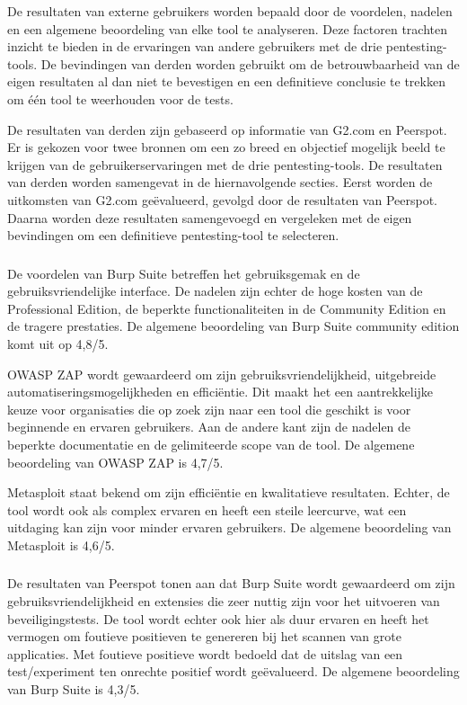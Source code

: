 De resultaten van externe gebruikers worden bepaald door de voordelen, nadelen en een algemene 
beoordeling van elke tool te analyseren. Deze factoren trachten inzicht te bieden in de ervaringen van andere gebruikers met de drie pentesting-tools. 
De bevindingen van derden worden gebruikt om de betrouwbaarheid van de eigen resultaten al dan niet te bevestigen en een definitieve conclusie 
te trekken om één tool te weerhouden voor de tests.

De resultaten van derden zijn gebaseerd op informatie van G2.com en Peerspot. Er is gekozen voor twee bronnen om een zo 
breed en objectief mogelijk beeld te krijgen van de gebruikerservaringen met de drie pentesting-tools. De resultaten van derden worden 
samengevat in de hiernavolgende secties. Eerst worden de uitkomsten van G2.com geëvalueerd, gevolgd door de resultaten van Peerspot. 
Daarna worden deze resultaten samengevoegd en vergeleken met de eigen bevindingen om een definitieve pentesting-tool te 
selecteren.

\subsubsection{}
De voordelen van Burp Suite betreffen het gebruiksgemak en de gebruiksvriendelijke interface. De nadelen zijn echter 
de hoge kosten van de Professional Edition, de beperkte functionaliteiten in de Community Edition en de tragere prestaties. De 
algemene beoordeling van Burp Suite community edition komt uit op 4,8/5.

OWASP ZAP wordt gewaardeerd om zijn gebruiksvriendelijkheid, uitgebreide automatiseringsmogelijkheden en efficiëntie. 
Dit maakt het een aantrekkelijke keuze voor organisaties die op zoek zijn naar een tool die geschikt is voor beginnende en 
ervaren gebruikers. Aan de andere kant zijn de nadelen de beperkte documentatie en de gelimiteerde scope van de tool. De 
algemene beoordeling van OWASP ZAP is 4,7/5.

Metasploit staat bekend om zijn efficiëntie en kwalitatieve resultaten. Echter, de tool wordt ook als complex ervaren en 
heeft een steile leercurve, wat een uitdaging kan zijn voor minder ervaren gebruikers. De algemene beoordeling van Metasploit 
is 4,6/5.

\subsubsection{}
De resultaten van Peerspot tonen aan dat Burp Suite wordt gewaardeerd om zijn gebruiksvriendelijkheid en extensies die zeer 
nuttig zijn voor het uitvoeren van beveiligingstests. De tool wordt echter ook hier als duur ervaren en heeft het vermogen om foutieve 
positieven te genereren bij het scannen van grote applicaties. Met foutieve positieve wordt bedoeld dat de uitslag van een 
test/experiment ten onrechte positief wordt geëvalueerd. De algemene beoordeling van Burp Suite is 4,3/5.

